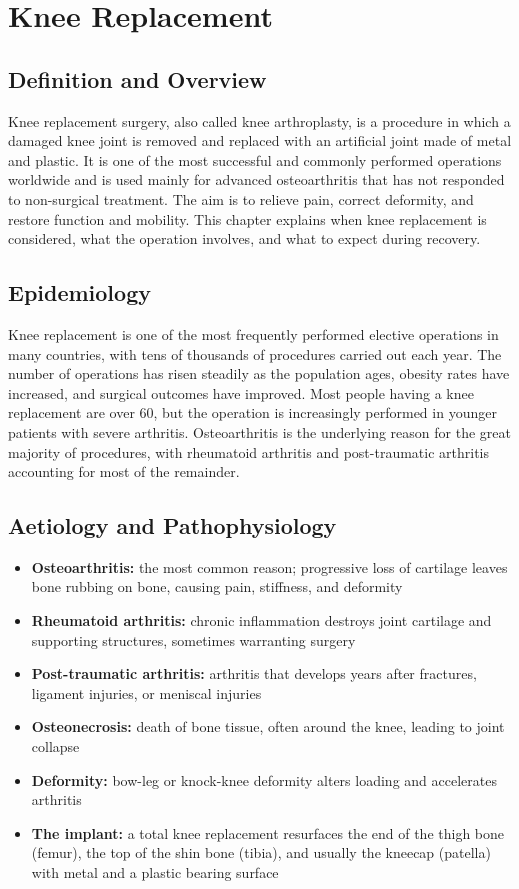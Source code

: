 \chapter{Knee Replacement}

\section*{Definition and Overview}
Knee replacement surgery, also called knee arthroplasty, is a procedure in which a damaged knee joint is removed and replaced with an artificial joint made of metal and plastic. It is one of the most successful and commonly performed operations worldwide and is used mainly for advanced osteoarthritis that has not responded to non-surgical treatment. The aim is to relieve pain, correct deformity, and restore function and mobility. This chapter explains when knee replacement is considered, what the operation involves, and what to expect during recovery.

\section*{Epidemiology}
Knee replacement is one of the most frequently performed elective operations in many countries, with tens of thousands of procedures carried out each year. The number of operations has risen steadily as the population ages, obesity rates have increased, and surgical outcomes have improved. Most people having a knee replacement are over 60, but the operation is increasingly performed in younger patients with severe arthritis. Osteoarthritis is the underlying reason for the great majority of procedures, with rheumatoid arthritis and post-traumatic arthritis accounting for most of the remainder.

\section*{Aetiology and Pathophysiology}
\begin{itemize}
    \item \textbf{Osteoarthritis:} the most common reason; progressive loss of cartilage leaves bone rubbing on bone, causing pain, stiffness, and deformity
    \item \textbf{Rheumatoid arthritis:} chronic inflammation destroys joint cartilage and supporting structures, sometimes warranting surgery
    \item \textbf{Post-traumatic arthritis:} arthritis that develops years after fractures, ligament injuries, or meniscal injuries
    \item \textbf{Osteonecrosis:} death of bone tissue, often around the knee, leading to joint collapse
    \item \textbf{Deformity:} bow-leg or knock-knee deformity alters loading and accelerates arthritis
    \item \textbf{The implant:} a total knee replacement resurfaces the end of the thigh bone (femur), the top of the shin bone (tibia), and usually the kneecap (patella) with metal and a plastic bearing surface
\end{itemize}

